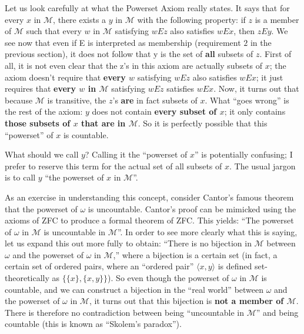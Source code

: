 \documentclass[10pt]{article}
\newcommand\axiom[1]{\textmd{#1}}
\theoremstyle{definition}
\theoremstyle{remark}
\begin{document}
Let us look carefully at what the Powerset Axiom really states. It says that for every $x$ in $\mathcal M$, there exists a $y$ in $\mathcal M$ with the following property: if $z$ is a member of $\mathcal M$ such that every $w$ in $\mathcal M$ satisfying $w E z$ also satisfies $w E x$, then $z E y$. We see now that even if E is interpreted as membership (requirement $2$ in the previous section), it does not follow that y is the set of \textbf{all} subsets of $z$. First of all, it is not even clear that the z's in this axiom are actually subsets of $x$; the axiom doesn't require that \textbf{every $w$} satisfying $w E z$ also satisfies $w E x$; it just requires that \textbf{every $w$ in $\mathcal M$} satisfying $w E z$ satisfies $w E x$. Now, it turns out that because $\mathcal M$ is transitive, the $z$'s \textbf{are} in fact subsets of $x$. What ``goes wrong'' is the rest of the axiom: $y$ does not contain \textbf{every subset of $x$}; it only contains \textbf{those subsets of $x$ that are in $\mathcal M$}. So it is perfectly possible that this ``powerset'' of $x$ is countable.

What should we call $y$? Calling it the ``powerset of $x$'' is potentially confusing; I prefer to reserve this term for the actual set of all subsets of $x$. The usual jargon is to call $y$ ``the powerset of $x$ in $\mathcal M$''.

As an exercise in understanding this concept, consider Cantor's famous theorem that the powerset of $\omega$ is uncountable. Cantor's proof can be mimicked using the axioms of \axiom{ZFC} to produce a formal theorem of \axiom{ZFC}. This yields: ``The powerset of $\omega$ in $\mathcal M$ is uncountable in $\mathcal M$''. In order to see more clearly what this is saying, let us expand this out more fully to obtain: ``There is no bijection in $\mathcal M$ between $\omega$ and the powerset of $\omega$ in $\mathcal M$,'' where a bijection is a certain set (in fact, a certain set of ordered pairs, where an ``ordered pair'' $\langle x,y\rangle$ is defined set-theoretically as $\{\{x\}, \{x,y\}\}$). So even though the powerset of $\omega$ in $\mathcal M$ is countable, and we can construct a bijection in the ``real world'' between $\omega$ and the powerset of $\omega$ in $\mathcal M$, it turns out that this bijection is \textbf{not a member of $\mathcal M$}. There is therefore no contradiction between being ``uncountable in $\mathcal M$'' and being countable (this is known as ``Skolem's paradox'').
\end{document}
